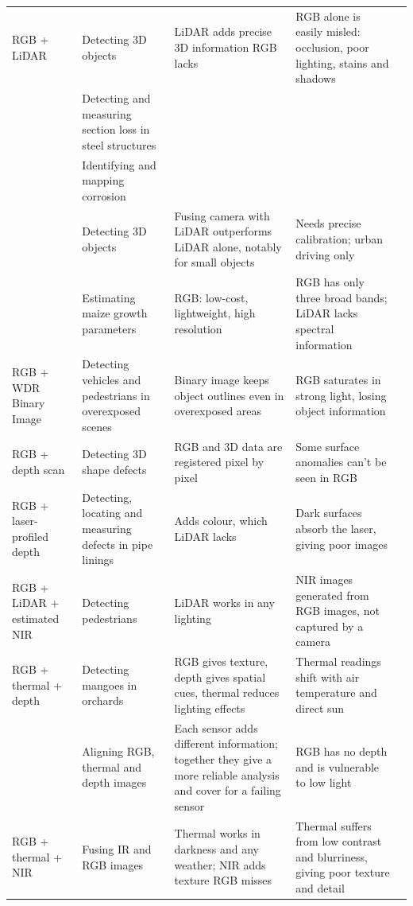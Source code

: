 {\begin{xltabular}{\textwidth}{>{\RaggedRight\arraybackslash}p{2.1cm}>{\RaggedRight\arraybackslash}p{2.9cm}>{\RaggedRight\arraybackslash}X>{\RaggedRight\arraybackslash}Xp{0.95cm}}
\midrule
RGB + LiDAR & Detecting 3D objects & LiDAR adds precise 3D information RGB lacks & RGB alone is easily misled: occlusion, poor lighting, stains and shadows & \citep{Zhang2026d} \\
 & Detecting and measuring section loss in steel structures &  &  & \citep{Maru2025} \\
 & Identifying and mapping corrosion &  &  & \citep{PimenteldeFigueiredo2025} \\
 & Detecting 3D objects & Fusing camera with LiDAR outperforms LiDAR alone, notably for small objects & Needs precise calibration; urban driving only & \citep{Cheng2025} \\
 & Estimating maize growth parameters & RGB: low-cost, lightweight, high resolution & RGB has only three broad bands; LiDAR lacks spectral information & \citep{Tang2025} \\
\midrule
RGB + WDR Binary Image & Detecting vehicles and pedestrians in overexposed scenes & Binary image keeps object outlines even in overexposed areas & RGB saturates in strong light, losing object information & \citep{Byeon2026} \\
\midrule
RGB + depth scan & Detecting 3D shape defects & RGB and 3D data are registered pixel by pixel & Some surface anomalies can't be seen in RGB & \citep{Asad2026} \\
\midrule
RGB + laser-profiled depth & Detecting, locating and measuring defects in pipe linings & Adds colour, which LiDAR lacks & Dark surfaces absorb the laser, giving poor images & \citep{Gunatilake2021} \\
\midrule
RGB + LiDAR + estimated NIR & Detecting pedestrians & LiDAR works in any lighting & NIR images generated from RGB images, not captured by a camera & \citep{Wu2025} \\
\midrule
RGB + thermal + depth & Detecting mangoes in orchards & RGB gives texture, depth gives spatial cues, thermal reduces lighting effects & Thermal readings shift with air temperature and direct sun & \citep{Cao2026} \\
 & Aligning RGB, thermal and depth images & Each sensor adds different information; together they give a more reliable analysis and cover for a failing sensor & RGB has no depth and is vulnerable to low light & \citep{Nooralishahi2022} \\
\midrule
RGB + thermal + NIR & Fusing IR and RGB images & Thermal works in darkness and any weather; NIR adds texture RGB misses & Thermal suffers from low contrast and blurriness, giving poor texture and detail & \citep{Laidouni2025} \\

\end{xltabular}}
